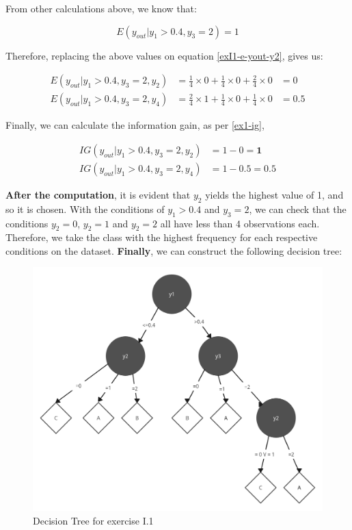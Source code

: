 \documentclass[12pt]{article}
\begin{document}
\begin{enumerate}[leftmargin=\labelsep]
    From other calculations above, we know that:

    \[
        E(y_{out} | y_1 > 0.4 , y_3 = 2) = 1
    \]

    Therefore, replacing the above values on equation \eqref{exI1-e-yout-y2}, gives us:

    \[
        \begin{aligned}
            E(y_{out} | y_1>0.4, y_3 = 2, y_2) & = \frac{1}{4} \times 0 + \frac{1}{4} \times 0 + \frac{2}{4} \times 0 & = 0 \\
            E(y_{out} | y_1>0.4, y_3 = 2, y_4) & = \frac{2}{4} \times 1 + \frac{1}{4} \times 0 + \frac{1}{4} \times 0 & = 0.5
        \end{aligned}
    \]

    Finally, we can calculate the information gain, as per \eqref{ex1-ig},

    \[
        \begin{aligned}
            IG(y_{out} |y_1 > 0.4, y_3 = 2, y_{2}) & = 1 - 0 = \textbf{1} \\
            IG(y_{out} |y_1 > 0.4, y_3 = 2, y_{4}) & = 1 - 0.5 = 0.5
        \end{aligned}
    \]

    \textbf{After the computation}, it is evident that $y_2$ yields the highest value of 1, and so it is chosen. With the conditions of $y_1 > 0.4$ and $y_3 = 2$, we
    can check that the conditions $y_2 = 0$, $y_2 = 1$ and $y_2 = 2$ all have less than 4 observations each. Therefore, we take the class with the highest frequency
    for each respective conditions on the dataset. \textbf{Finally}, we can construct the following decision tree:

    \begin{figure}[H]
        \centering
        \includegraphics[width=12cm]{./assets/decision_tree_ex1_PartI.png}
        \caption{Decision Tree for exercise I.1}
        \label{fig:decision_tree}
    \end{figure}


\end{enumerate}
\end{document}
